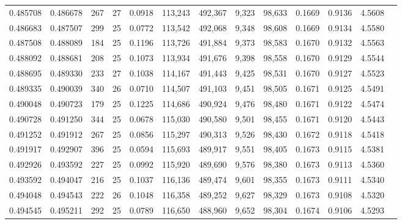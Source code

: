\begin{tabular}{rrrrrrrrrrrrr}
0.485708 & 0.486678 &   267 &  27 &                                     0.0918 & 113,243 & 492,367 &   9,323 &  98,633 & 0.1669 & 0.9136 & 4.5608 \\
0.486683 & 0.487507 &   299 &  25 &                                     0.0772 & 113,542 & 492,068 &   9,348 &  98,608 & 0.1669 & 0.9134 & 4.5580 \\
0.487508 & 0.488089 &   184 &  25 &                                     0.1196 & 113,726 & 491,884 &   9,373 &  98,583 & 0.1670 & 0.9132 & 4.5563 \\
0.488092 & 0.488681 &   208 &  25 &                                     0.1073 & 113,934 & 491,676 &   9,398 &  98,558 & 0.1670 & 0.9129 & 4.5544 \\
0.488695 & 0.489330 &   233 &  27 &                                     0.1038 & 114,167 & 491,443 &   9,425 &  98,531 & 0.1670 & 0.9127 & 4.5523 \\
0.489335 & 0.490039 &   340 &  26 &                                     0.0710 & 114,507 & 491,103 &   9,451 &  98,505 & 0.1671 & 0.9125 & 4.5491 \\
0.490048 & 0.490723 &   179 &  25 &                                     0.1225 & 114,686 & 490,924 &   9,476 &  98,480 & 0.1671 & 0.9122 & 4.5474 \\
0.490728 & 0.491250 &   344 &  25 &                                     0.0678 & 115,030 & 490,580 &   9,501 &  98,455 & 0.1671 & 0.9120 & 4.5443 \\
0.491252 & 0.491912 &   267 &  25 &                                     0.0856 & 115,297 & 490,313 &   9,526 &  98,430 & 0.1672 & 0.9118 & 4.5418 \\
0.491917 & 0.492907 &   396 &  25 &                                     0.0594 & 115,693 & 489,917 &   9,551 &  98,405 & 0.1673 & 0.9115 & 4.5381 \\
0.492926 & 0.493592 &   227 &  25 &                                     0.0992 & 115,920 & 489,690 &   9,576 &  98,380 & 0.1673 & 0.9113 & 4.5360 \\
0.493592 & 0.494047 &   216 &  25 &                                     0.1037 & 116,136 & 489,474 &   9,601 &  98,355 & 0.1673 & 0.9111 & 4.5340 \\
0.494048 & 0.494543 &   222 &  26 &                                     0.1048 & 116,358 & 489,252 &   9,627 &  98,329 & 0.1673 & 0.9108 & 4.5320 \\
0.494545 & 0.495211 &   292 &  25 &                                     0.0789 & 116,650 & 488,960 &   9,652 &  98,304 & 0.1674 & 0.9106 & 4.5293 \\

\end{tabular}
